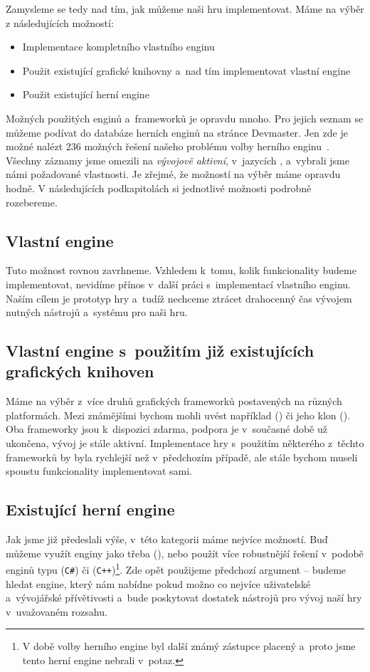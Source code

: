 \pagebreak
Zamysleme se tedy nad tím, jak můžeme naši hru implementovat. Máme na výběr z následujících možností:
\begin{itemize}
	\item Implementace kompletního vlastního enginu
	\item Použit existující grafické knihovny a~nad tím implementovat vlastní engine
	\item Použit existující herní engine
\end{itemize}

Možných použitých enginů a~frameworků je opravdu mnoho. Pro jejich seznam se můžeme podívat do databáze herních enginů na stránce Devmaster. Jen zde je možné nalézt 236 možných řešení našeho problému volby herního enginu~\citep{engines_list}. Všechny záznamy jsme omezili na \textit{vývojově aktivní}, v~jazycích \CS{}, \CPP{} a~vybrali jsme námi požadované vlastnosti.
Je zřejmé, že možností na výběr máme opravdu hodně. V následujících podkapitolách si jednotlivé možnosti podrobně rozebereme.

\subsection{Vlastní engine}
Tuto možnost rovnou zavrhneme. Vzhledem k~tomu, kolik funkcionality budeme implementovat, nevidíme přínos v~další práci s~implementací vlastního enginu. Naším cílem je prototyp hry a~tudíž nechceme ztrácet drahocenný čas vývojem nutných nástrojů a~systému pro naši hru.


\subsection{Vlastní engine s~použitím již existujících grafických knihoven}
Máme na výběr z~více druhů grafických frameworků postavených na různých platformách. Mezi známějšími bychom mohli uvést například \XNA{} (\CS{}) či jeho klon \MG{} (\CS{}). Oba frameworky jsou k~dispozici zdarma, podpora \XNA{} je v~současné době už ukončena, vývoj \MG{} je stále aktivní. Implementace hry s~použitím některého z~těchto frameworků by byla rychlejší než v~předchozím případě, ale stále bychom museli spoustu funkcionality implementovat sami. 

\subsection{Existující herní engine}
Jak jsme již předeslali výše, v~této kategorii máme nejvíce možností. Buď můžeme využít enginy jako třeba \OG{} (\CPP{}), nebo použít více robustnější řešení v~podobě enginů typu \UN{} (\texttt{C\#}) či \UE{} (\texttt{C++})\footnote{V době volby herního engine byl další známý zástupce \CRY{} placený a~proto jsme tento herní engine nebrali v~potaz.}. Zde opět použijeme předchozí argument -- budeme hledat engine, který nám nabídne pokud možno co nejvíce uživatelské a~vývojářské přívětivosti a~bude poskytovat dostatek nástrojů pro vývoj naší hry v~uvažovaném rozsahu.

